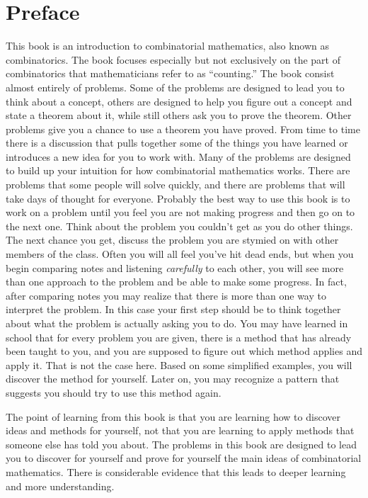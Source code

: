 \documentclass[10pt,]{book}
\theoremstyle{plain}
\theoremstyle{definition}
\theoremstyle{definition}
\numberwithin{equation}{chapter}
\begin{document}
\chapter*{Preface}\label{preface}
This book is an introduction to combinatorial mathematics, also known as combinatorics. The book focuses especially but not exclusively on the part of combinatorics that mathematicians refer to as ``counting.'' The book consist almost entirely of problems.  Some of the problems are designed to lead you to think about a concept, others are designed to help you figure out a concept and state a theorem about it, while still others ask you to prove the theorem. Other problems give you a chance to use a theorem you have proved. From time to time there is a discussion that pulls together some of the things you have learned or introduces a new idea for you to work with. Many of the problems are designed to build up your intuition for how combinatorial mathematics works. There are problems that some people will solve quickly, and there are problems that will take days of thought for everyone. Probably the best way to use this book is to work on a problem until you feel you are not making progress and then go on to the next one. Think about the problem you couldn't get as you do other things. The next chance you get, discuss the problem you are stymied on with other members of the class. Often you will all feel you've hit dead ends, but when you begin comparing notes and listening \emph{carefully} to each other, you will see more than one approach to the problem and be able to make some progress. In fact, after comparing notes you may realize that there is more than one way to interpret the problem. In this case your first step should be to think together about what the problem is actually asking you to do. You may have learned in school that for every problem you are given, there is a method that has already been taught to you, and you are supposed to figure out which method applies and apply it. That is not the case here.  Based on some simplified examples, you will discover the method for yourself. Later on, you may recognize a pattern that suggests you should try to use this method again.%
\par
The point of learning from this book is that you are learning how to discover ideas and methods for yourself, not that you are learning to apply methods that someone else has told you about. The problems in this book are designed to lead you to discover for yourself and prove for yourself the main ideas of combinatorial mathematics.  There is considerable evidence that this leads to deeper learning and more understanding.%
\end{document}
